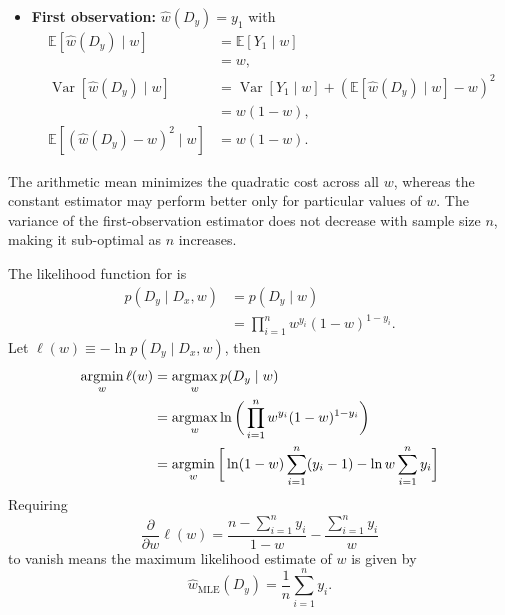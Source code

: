 \begin{example}
\begin{itemize}
		\item \textbf{First observation:} 
		\(
		\hat{w}(D_y) = y_1
		\)
		with 
		\begin{equation} 
			\begin{split} 
				\mathbb{E}[\hat{w}(D_y)\mid w] &= \mathbb{E}[Y_1\mid w]\\ & = w,\\ \operatorname{Var}[\hat{w}(D_y)\mid w] &= \operatorname{Var}[Y_1\mid w] +(\mathbb{E}[\hat{w}(D_y)\mid w]-w)^2\\ &= w(1-w),\\ \mathbb{E}[(\hat{w}(D_y)-w)^2\mid w] &= w(1-w).
			\end{split} 
		\end{equation}
	\end{itemize}
	The arithmetic mean minimizes the quadratic cost across all $w$, whereas the constant estimator may perform better only for particular values of $w$. The variance of the first-observation estimator does not decrease with sample size $n$, making it sub-optimal as $n$ increases.
\end{example}

\begin{example}
	\label{ex:bernoulli_mle}
	The likelihood function for  is
	\begin{equation} 
		\begin{split} 
			p(D_y\mid D_x,w) & =p(D_y\mid w)\\ & = \prod_{i=1}^nw^{y_i}(1-w)^{1-y_i}. 
		\end{split} 
	\end{equation} 
	Let $\ell(w)\equiv -\ln p(D_y\mid D_x,w)$, then 
	\begin{equation} 
		\begin{split} 
			\operatorname*{argmin}_w \ell(w) & = \operatorname*{argmax}_wp(D_y\mid w)\\ &= \operatorname*{argmax}_w\ln \bigg(\prod_{i=1}^nw^{y_i}(1-w)^{1-y_i}\bigg)\\ &=\operatorname*{argmin}_w \bigg[ \ln(1-w)\sum_{i=1}^n(y_i-1)-\ln w\sum_{i=1}^ny_i\bigg] 
		\end{split} 
	\end{equation}  
	Requiring
	\begin{equation} 
		\frac{\partial }{\partial w}\ell(w)=\frac{n-\sum_{i=1}^ny_i}{1-w}-\frac{\sum_{i=1}^ny_i}{w}
	\end{equation}
	 to vanish means the maximum likelihood estimate of $w$ is given by 
	\begin{equation} 
		\hat{w}_{\text{MLE}}(D_y)=\frac{1}{n}\sum_{i=1}^ny_i. 
	\end{equation} 
\end{example} 

